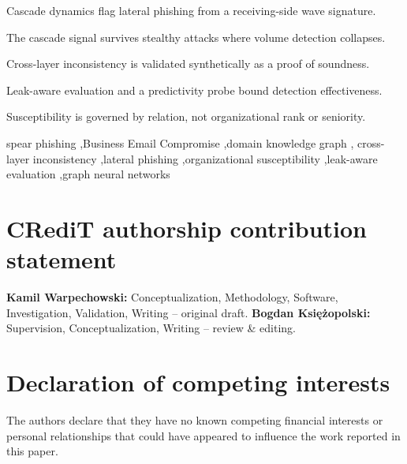 \documentclass[a4paper,fleqn]{cas-sc}
\begin{document}
\begin{highlights}
\item Cascade dynamics flag lateral phishing from a receiving-side wave signature.
\item The cascade signal survives stealthy attacks where volume detection collapses.
\item Cross-layer inconsistency is validated synthetically as a proof of soundness.
\item Leak-aware evaluation and a predictivity probe bound detection effectiveness.
\item Susceptibility is governed by relation, not organizational rank or seniority.
\end{highlights}

\begin{keywords}
spear phishing \sep Business Email Compromise \sep domain knowledge graph \sep
cross-layer inconsistency \sep lateral phishing \sep organizational susceptibility
\sep leak-aware evaluation \sep graph neural networks
\end{keywords}

\maketitle









\section*{CRediT authorship contribution statement}
\textbf{Kamil Warpechowski:} Conceptualization, Methodology, Software, Investigation, Validation,
Writing -- original draft. \textbf{Bogdan Ksi{\k{e}}{\.z}opolski:} Supervision, Conceptualization,
Writing -- review \& editing.

\section*{Declaration of competing interests}
The authors declare that they have no known competing financial interests or personal relationships
that could have appeared to influence the work reported in this paper.
\end{document}
